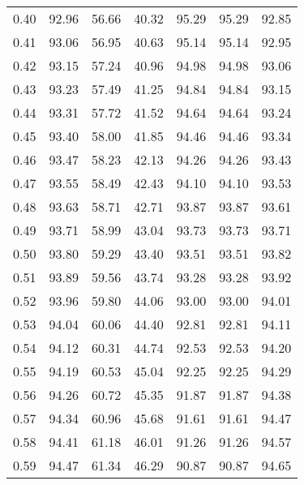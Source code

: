\begin{tabular}{|c|c|c|c|c|c|c|}
      0.40 &     92.96 &     56.66 &      40.32 &   95.29 &      95.29 &         92.85 \\
      0.41 &     93.06 &     56.95 &      40.63 &   95.14 &      95.14 &         92.95 \\
      0.42 &     93.15 &     57.24 &      40.96 &   94.98 &      94.98 &         93.06 \\
      0.43 &     93.23 &     57.49 &      41.25 &   94.84 &      94.84 &         93.15 \\
      0.44 &     93.31 &     57.72 &      41.52 &   94.64 &      94.64 &         93.24 \\
      0.45 &     93.40 &     58.00 &      41.85 &   94.46 &      94.46 &         93.34 \\
      0.46 &     93.47 &     58.23 &      42.13 &   94.26 &      94.26 &         93.43 \\
      0.47 &     93.55 &     58.49 &      42.43 &   94.10 &      94.10 &         93.53 \\
      0.48 &     93.63 &     58.71 &      42.71 &   93.87 &      93.87 &         93.61 \\
      0.49 &     93.71 &     58.99 &      43.04 &   93.73 &      93.73 &         93.71 \\
      0.50 &     93.80 &     59.29 &      43.40 &   93.51 &      93.51 &         93.82 \\
      0.51 &     93.89 &     59.56 &      43.74 &   93.28 &      93.28 &         93.92 \\
      0.52 &     93.96 &     59.80 &      44.06 &   93.00 &      93.00 &         94.01 \\
      0.53 &     94.04 &     60.06 &      44.40 &   92.81 &      92.81 &         94.11 \\
      0.54 &     94.12 &     60.31 &      44.74 &   92.53 &      92.53 &         94.20 \\
      0.55 &     94.19 &     60.53 &      45.04 &   92.25 &      92.25 &         94.29 \\
      0.56 &     94.26 &     60.72 &      45.35 &   91.87 &      91.87 &         94.38 \\
      0.57 &     94.34 &     60.96 &      45.68 &   91.61 &      91.61 &         94.47 \\
      0.58 &     94.41 &     61.18 &      46.01 &   91.26 &      91.26 &         94.57 \\
      0.59 &     94.47 &     61.34 &      46.29 &   90.87 &      90.87 &         94.65 \\

\end{tabular}
